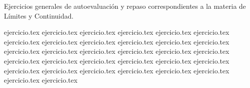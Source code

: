 
Ejercicios generales de autoevaluación y repaso correspondientes a la materia de Límites y Continuidad.

\begin{enumerate}
    {ejercicio.tex}
    {ejercicio.tex}
    {ejercicio.tex}
    {ejercicio.tex}
    {ejercicio.tex}
    {ejercicio.tex}
    {ejercicio.tex}
    {ejercicio.tex}
    {ejercicio.tex}
    {ejercicio.tex}
    \setcounter{enumi}{10}
    {ejercicio.tex}
    {ejercicio.tex}
    {ejercicio.tex}
    {ejercicio.tex}
    {ejercicio.tex}
    {ejercicio.tex}
    {ejercicio.tex}
    \setcounter{enumi}{24}
    {ejercicio.tex}
    {ejercicio.tex}
    {ejercicio.tex}
    {ejercicio.tex}
    {ejercicio.tex}
    {ejercicio.tex}
    \setcounter{enumi}{30}
    {ejercicio.tex}
    {ejercicio.tex}
    \setcounter{enumi}{32}
    {ejercicio.tex}
    {ejercicio.tex}
    {ejercicio.tex}
    {ejercicio.tex}
    {ejercicio.tex}
    {ejercicio.tex}
    {ejercicio.tex}
\end{enumerate}
